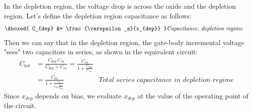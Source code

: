 In the depletion region, the voltage drop is across the oxide and the depletion region.  Let's define the depletion region capacitance as follows:
    \begin{align}
        \Aboxed{ C_{dep} &= \frac{\varepsilon_s}{x_{dep}} } &\textit{Capacitance, depletion regime}
    \end{align}
Then we can say that in the depletion region, the gate-body incremental voltage "sees" two capacitors in series, as shown in the equivalent circuit:
    \begin{align}
        C_{tot} &= \frac{C_{dep}\,C_{ox}}{C_{dep} + C_{ox}} = \frac{C_{ox}}{1 + \frac{C_{dep}}{C_{ox}}}\\
        &= \frac{C_{ox}} {1 + \frac{\varepsilon_s}{\varepsilon_{ox}\frac{t_{ox}}{x_{dep}}}} &\textit{Total series capacitance in depletion regime}
    \end{align}
Since $x_{dep}$ depends on bias, we evaluate $x_{dep}$ at the value of the operating point of the circuit.  
